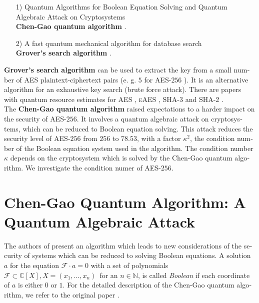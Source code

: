\documentclass[a4paper,11pt]{article}
\begin{document}
\begin{otherlanguage}{english}
\begin{itemize} [noitemsep, nolistsep]
  \item[1)] Quantum Algorithms for Boolean Equation Solving and Quantum Algebraic Attack on Cryptosystems \\
  \textbf{Chen-Gao quantum algorithm} \cite{QAA}.
  \vspace{0.1cm}
  \item[2)] A fast quantum mechanical algorithm for database search \\
  \textbf{Grover’s search algorithm} \cite{GRV}.
  \vspace{0.1cm}
\end{itemize}
\vspace{0.5cm}

\noindent
\textbf{Grover’s search algorithm} can be used to extract the key from a small number of \textsc{AES} plaintext-ciphertext pairs (e. g. $5$ for \textsc{AES}-$256$ \cite{GRO}). It is an alternative algorithm for an exhaustive key search (brute force attack). There are papers with quantum resource estimates for \textsc{AES} \cite{GRO}, \textsc{eAES} \cite{KUN, CEX}, \textsc{SHA-3} \cite{QSH} and \textsc{SHA-2} \cite{QSH}. \\

\noindent
The \textbf{Chen-Gao quantum algorithm} raised expectations to a harder impact on the security of \textsc{AES}-$256$. It involves a quantum algebraic attack on cryptosystems, which can be reduced to Boolean equation solving. This attack reduces the security level of \textsc{AES}-$256$ from $256$ to $78.53$, with a factor $\kappa^2$, the condition number of the Boolean equation system used in the algorithm. The condition number $\kappa$ depends on the cryptosystem which is solved by the Chen-Gao quantum algorithm. We investigate the condition numer of \textsc{AES}-$256$. \\


\section{Chen-Gao Quantum Algorithm: A Quantum Algebraic Attack}

\noindent
The authors of \cite{QAA} present an algorithm which leads to new considerations of the security of systems which can be reduced to solving Boolean equations. A solution $a$ for the equation $\mathcal{F} \cdot a = 0$ with a set of polynomials $\mathcal{F} \subset \mathbb{C}[X], X = (x_1, \ldots, x_n) \,$ for an $ n \in \mathbb{N}$, is called \textit{Boolean} if each coordinate of $a$ is either $0$ or $1$. For the detailed description of the Chen-Gao quantum algorithm, we refer to the original paper \cite{QAA}.\\


\end{otherlanguage}
\end{document}
